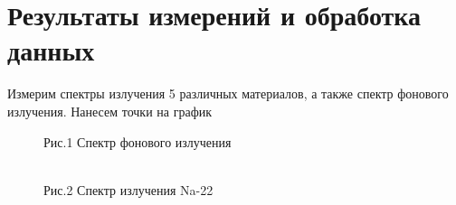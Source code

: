 \documentclass[12pt,a4paper]{article}
\begin{document}
\newpage
\section{Результаты измерений и обработка данных}

Измерим спектры излучения 5 различных материалов, а также спектр фонового излучения. Нанесем точки на график


\begin{figure}[H]
\begin{minipage}[h]{0.45\linewidth}
 Рис.1 Спектр фонового излучения \\
\end{minipage}
\hfill
\begin{minipage}[h]{0.45\linewidth}
 \\ Рис.2 Спектр излучения Na-22
\end{minipage}
\end{figure}
\end{document}
